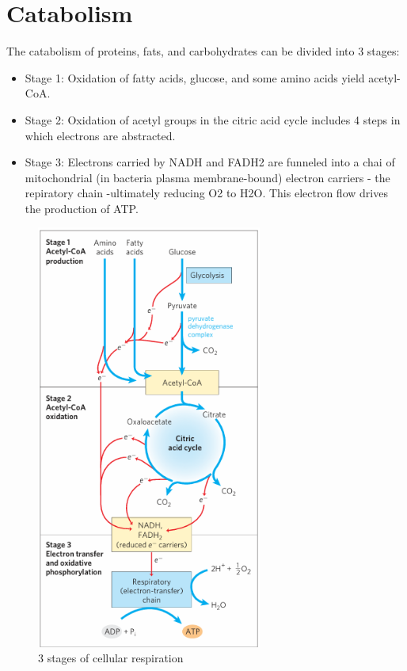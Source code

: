 \documentclass[../main.tex]{subfiles}
\begin{document}
	
\section{Catabolism}
The catabolism of proteins, fats, and carbohydrates can be divided into 3 stages: 
\begin{itemize}
	\item Stage 1: Oxidation of fatty acids, glucose, and some amino acids yield acetyl-CoA.
	\item Stage 2: Oxidation of acetyl groups in the citric acid cycle includes 4 steps in which electrons are abstracted. 
	\item Stage 3: Electrons carried by NADH and FADH2 are funneled into a chai of mitochondrial (in bacteria plasma membrane-bound) electron carriers - the repiratory chain -ultimately reducing O2 to H2O. This electron flow drives the production of ATP. 
\end{itemize}

\begin{figure}[H]
	\centering
	\includegraphics[height = 14cm]{gen1}
	\caption{3 stages of cellular respiration}
\end{figure}
	
\end{document}
